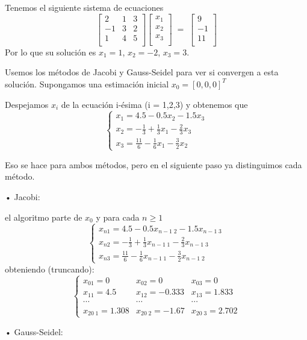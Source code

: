 \begin{ejemplo}
Tenemos el siguiente sistema de ecuaciones
\[ \begin{bmatrix}
2 & 1 & 3 \\
-1 & 3 & 2 \\
1 & 4 & 5 \\
\end{bmatrix}
\begin{bmatrix}
x_1 \\
x_2 \\
x_3 \\
\end{bmatrix} 
\; = \;
\begin{bmatrix}
9 \\
-1 \\
11 \\
\end{bmatrix}
\]
Por lo que su solución es $x_1 = 1$, $x_2 = -2$, $x_3 = 3$.

Usemos los métodos de Jacobi y Gauss-Seidel para ver si convergen a esta solución. Supongamos una estimación inicial $x_0 = \left[ 0,0,0 \right] ^T$

Despejamos $x_i$ de la ecuación i-ésima (i = 1,2,3) y obtenemos que
\[ \left\{ \begin{array}{c}
x_1 = 4.5 - 0.5x_2 - 1.5x_3 \\
x_2 = - \frac{1}{3} + \frac{1}{3} x_1 - \frac{2}{3} x_3 \\
x_3 = \frac{11}{6} - \frac{1}{6} x_1 - \frac{3}{2} x_2
\end{array}
\right. \]

Eso se hace para ambos métodos, pero en el siguiente paso ya distinguimos cada método.
	\begin{nlist}
	\item[•] Jacobi:
	
	el algoritmo parte de $x_0$ y para cada $n \geq 1$
	\[ \left\{ \begin{array}{c}
	x_{n1} = 4.5 - 0.5x_{n-1 \; 2} - 1.5x_{n-1 \; 3} \\
	x_{n2} = - \frac{1}{3} + \frac{1}{3} x_{n-1 \; 1} - \frac{2}{3} x_{n-1 \; 3} \\
	x_{n3} = \frac{11}{6} - \frac{1}{6} x_{n-1 \; 1} - \frac{3}{2} x_{n-1 \; 2}
	\end{array}
	\right. \]
	obteniendo (truncando):
	\[
	\left\{ \begin{array}{lll}
	x_{01} = 0 & x_{02} = 0 & x_{03} = 0 \\
	x_{11} = 4.5 & x_{12} = -0.333 & x_{13} = 1.833 \\
	\cdots & \cdots & \cdots \\
	x_{20 \; 1} = 1.308 & x_{20 \; 2} = -1.67 & x_{20 \; 3} = 2.702
	\end{array}
	\right.
	\]	
	\item[•] Gauss-Seidel:
	

\end{nlist}
\end{ejemplo}
